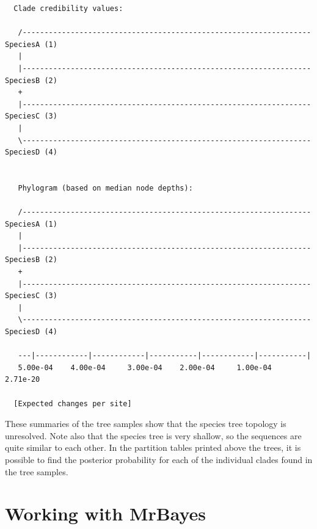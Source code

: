 \documentclass[12pt]{book}
\begin{document}
\scriptsize
\begin{singlespacing}
\begin{verbatim}
  Clade credibility values:
 
   /------------------------------------------------------------------ SpeciesA (1)
   |                                                                               
   |------------------------------------------------------------------ SpeciesB (2)
   +                                                                               
   |------------------------------------------------------------------ SpeciesC (3)
   |                                                                               
   \------------------------------------------------------------------ SpeciesD (4)
                                                                                   

   Phylogram (based on median node depths):

   /------------------------------------------------------------------ SpeciesA (1)
   |                                                                               
   |------------------------------------------------------------------ SpeciesB (2)
   +                                                                               
   |------------------------------------------------------------------ SpeciesC (3)
   |                                                                               
   \------------------------------------------------------------------ SpeciesD (4)
                                                                                   
   ---|------------|------------|-----------|------------|-----------|             
   5.00e-04    4.00e-04     3.00e-04    2.00e-04     1.00e-04    2.71e-20 
 
  [Expected changes per site]
\end{verbatim}
\end{singlespacing}
\normalsize

These summaries of the tree samples show that the species tree topology is unresolved. Note also
that the species tree is very shallow, so the sequences are quite similar to each other. In the
partition tables printed above the trees, it is possible to find the posterior probability for each
of the individual clades found in the tree samples.


\chapter{Working with MrBayes}
\label{advancedTopics}
\end{document}
